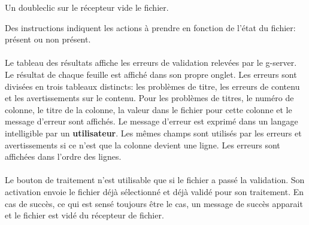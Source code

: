 Un doubleclic sur le récepteur vide le fichier.

Des instructions indiquent les actions à prendre en fonction de l'état du fichier: présent ou non présent. %

\paragraph{}
Le tableau des résultats affiche les erreurs de validation relevées par le \gls{g-server}.
Le résultat de chaque feuille est affiché dans son propre onglet.
Les erreurs sont divisées en trois tableaux distincts: les problèmes de titre, les erreurs de contenu et les avertissements sur le contenu.
Pour les problèmes de titres, le numéro de colonne, le titre de la colonne, la valeur dans le fichier pour cette colonne et le message d'erreur sont affichés.
Le message d'erreur est exprimé dans un langage intelligible par un \textbf{utilisateur}.
Les mêmes champs sont utilisés par les erreurs et avertissements si ce n'est que la colonne devient une ligne.
Les erreurs sont affichées dans l'ordre des lignes.

\paragraph{}
Le bouton de traitement n'est utilisable que si le fichier a passé la validation.
Son activation envoie le fichier déjà sélectionné et déjà validé pour son traitement.
En cas de succès, ce qui est sensé toujours être le cas, un message de succès apparait et le fichier est vidé du récepteur de fichier.

